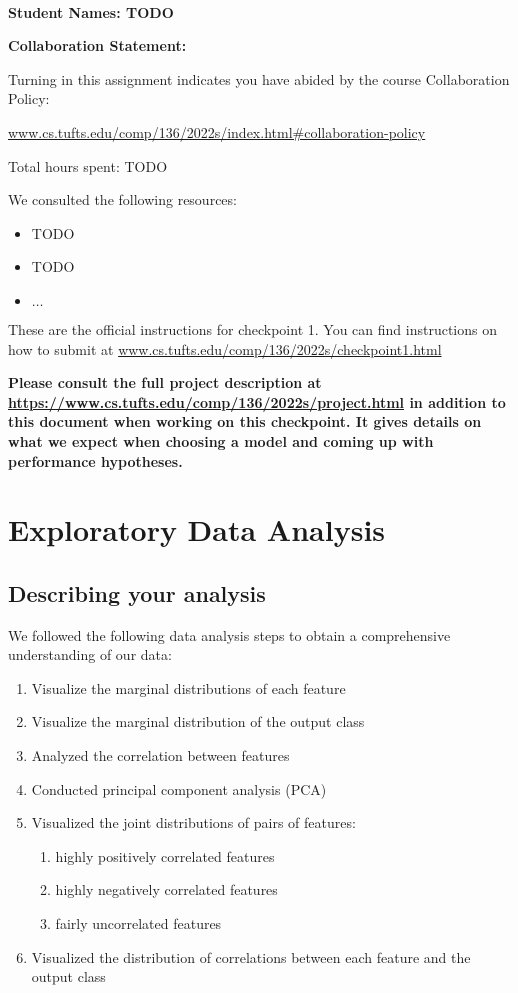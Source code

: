 \documentclass[12pt]{article}
\begin{document}
~~\\ %

{\Large{\bf Student Names: TODO}}


{\Large{\bf Collaboration Statement:}}

Turning in this assignment indicates you have abided by the course Collaboration Policy:

\url{www.cs.tufts.edu/comp/136/2022s/index.html#collaboration-policy}

Total hours spent: TODO

We consulted the following resources:
\begin{itemize}
\item TODO
\item TODO
\item $\ldots$	
\end{itemize}

These are the official instructions for checkpoint 1.  You can find instructions on how to submit at \url{www.cs.tufts.edu/comp/136/2022s/checkpoint1.html}

\textbf{Please consult the full project description at \url{https://www.cs.tufts.edu/comp/136/2022s/project.html} in addition to this document when working on this checkpoint.  It gives details on what we expect when choosing a model and coming up with performance hypotheses.}

\newpage

\section{Exploratory Data Analysis}

\subsection{Describing your analysis}

We followed the following data analysis steps to obtain a comprehensive understanding of our data:

\begin{enumerate}
\item Visualize the marginal distributions of each feature
\item Visualize the marginal distribution of the output class
\item Analyzed the correlation between features
\item Conducted principal component analysis (PCA)
\item Visualized the joint distributions of pairs of features:
\begin{enumerate}
\item highly positively correlated features
\item highly negatively correlated features
\item fairly uncorrelated features
\end{enumerate}
\item Visualized the distribution of correlations between each feature and the output class
\end{enumerate}
\end{document}
